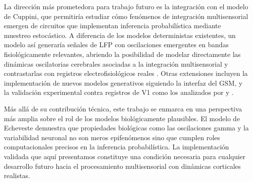 \documentclass[spanish,a4paper,11pt]{article}
\begin{document}
La dirección más prometedora para trabajo futuro es la integración con el modelo de Cuppini, que permitiría estudiar cómo fenómenos de integración multisensorial emergen de circuitos que implementan inferencia probabilística mediante muestreo estocástico. A diferencia de los modelos deterministas existentes, un modelo así generaría señales de LFP con oscilaciones emergentes en bandas fisiológicamente relevantes, abriendo la posibilidad de modelar directamente las dinámicas oscilatorias cerebrales asociadas a la integración multisensorial y contrastarlas con registros electrofisiológicos reales \citep{ursino2017multisensory}. Otras extensiones incluyen la implementación de nuevos modelos generativos siguiendo la interfaz del GSM, y la validación experimental contra registros de V1 como los analizados por \citet{banyai2019stimulus} y \citet{haefner2016perceptual}.

Más allá de su contribución técnica, este trabajo se enmarca en una perspectiva más amplia sobre el rol de los modelos biológicamente plausibles. El modelo de Echeveste demuestra que propiedades biológicas como las oscilaciones gamma y la variabilidad neuronal no son meros epifenómenos sino que cumplen roles computacionales precisos en la inferencia probabilística. La implementación validada que aquí presentamos constituye una condición necesaria para cualquier desarrollo futuro hacia el procesamiento multisensorial con dinámicas corticales realistas.




\end{document}
